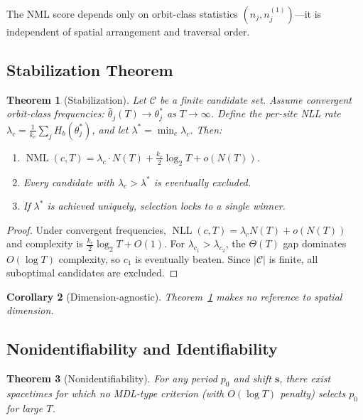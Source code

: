 \documentclass[letterpaper]{article}
\newtheorem{theorem}{Theorem}
\newtheorem{corollary}[theorem]{Corollary}
\theoremstyle{definition}
\theoremstyle{remark}
\newcommand{\bs}{\mathbf{s}}
\newcommand{\NML}{\operatorname{NML}}
\newcommand{\NLL}{\operatorname{NLL}}
\newcommand{\Hb}{H_b}
\begin{document}
The NML score depends only on orbit-class statistics $(n_j, n_j^{(1)})$---it is independent of spatial arrangement and traversal order.

\subsection{Stabilization Theorem}

\begin{theorem}[Stabilization]\label{thm:stabilization}
Let $\mathcal{C}$ be a finite candidate set.
Assume convergent orbit-class frequencies: $\hat{\theta}_j(T) \to \theta_j^*$ as $T \to \infty$.
Define the per-site NLL rate $\lambda_c = \frac{1}{k_c} \sum_{j} \Hb(\theta_j^*)$, and let $\lambda^* = \min_c \lambda_c$.
Then:
\begin{enumerate}
    \item[\textup{(i)}] $\NML(c, T) = \lambda_c \cdot N(T) + \frac{k_c}{2}\log_2 T + o(N(T))$.
    \item[\textup{(ii)}] Every candidate with $\lambda_c > \lambda^*$ is eventually excluded.
    \item[\textup{(iii)}] If $\lambda^*$ is achieved uniquely, selection locks to a single winner.
\end{enumerate}
\end{theorem}

\begin{proof}
Under convergent frequencies, $\NLL(c,T) = \lambda_c N(T) + o(N(T))$ and complexity is $\frac{k_c}{2}\log_2 T + O(1)$.
For $\lambda_{c_1} > \lambda_{c_2}$, the $\Theta(T)$ gap dominates $O(\log T)$ complexity, so $c_1$ is eventually beaten.
Since $|\mathcal{C}|$ is finite, all suboptimal candidates are excluded.
\end{proof}

\begin{corollary}[Dimension-agnostic]
Theorem~\ref{thm:stabilization} makes no reference to spatial dimension.
\end{corollary}

\subsection{Nonidentifiability and Identifiability}

\begin{theorem}[Nonidentifiability]\label{thm:nonident}
For any period $p_0$ and shift $\bs$, there exist spacetimes for which no MDL-type criterion (with $O(\log T)$ penalty) selects $p_0$ for large $T$.
\end{theorem}
\end{document}
